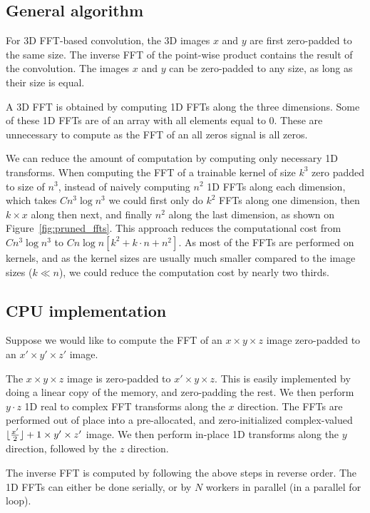 \documentclass[conference]{./IEEEtran/IEEEtran}
\DeclarePairedDelimiter{\floor}{\lfloor}{\rfloor}
\begin{document}
\subsection{General algorithm}
  For 3D FFT-based convolution, the 3D images $x$ and $y$ are first
  zero-padded to the same size.  The inverse FFT of the point-wise
  product contains the result of the convolution.  The images $x$ and
  $y$ can be zero-padded to any size, as long as their size is equal.

  A 3D FFT is obtained by computing 1D FFTs along the three
  dimensions.  Some of these 1D FFTs are of an array with all elements
  equal to $0$.  These are unnecessary to compute as the FFT of
  an all zeros signal is all zeros.

  We can reduce the amount of computation by computing only necessary
  1D transforms.  When computing the FFT of a trainable kernel of size
  $k^3$ zero padded to size of $n^3$, instead of naively computing
  $n^2$ 1D FFTs along each dimension, which takes $C n^3 \log n^3$ we
  could first only do $k^2$ FFTs along one dimension, then $k \times
  x$ along then next, and finally $n^2$ along the last dimension, as
  shown on Figure~\ref{fig:pruned_ffts}.  This approach reduces the
  computational cost from $C n^3 \log n^3$ to $C n\log n[k^2 + k \cdot
  n + n^2]$.  As most of the FFTs are performed on kernels, and as the
  kernel sizes are usually much smaller compared to the image sizes
  ($k \ll n$), we could reduce the computation cost by nearly two
  thirds.

\subsection{CPU implementation}
  Suppose we would like to compute the FFT of an $x \times y \times z$
  image zero-padded to an $x' \times y' \times z'$ image.

  The $x \times y \times z$ image is zero-padded to $x' \times
  y \times z$.  This is easily implemented by doing a linear copy of
  the memory, and zero-padding the rest. We then perform $y \cdot z$
  1D real to complex FFT transforms along the $x$ direction.  The FFTs
  are performed out of place into a pre-allocated, and
  zero-initialized complex-valued $\floor{\frac{x'}{2}} + 1 \times
  y' \times z'$ image.  We then perform in-place 1D transforms along
  the $y$ direction, followed by the $z$ direction.

  The inverse FFT is computed by following the above steps in reverse
  order.  The 1D FFTs can either be done serially, or by $N$ workers
  in parallel (in a parallel for loop).
\end{document}
